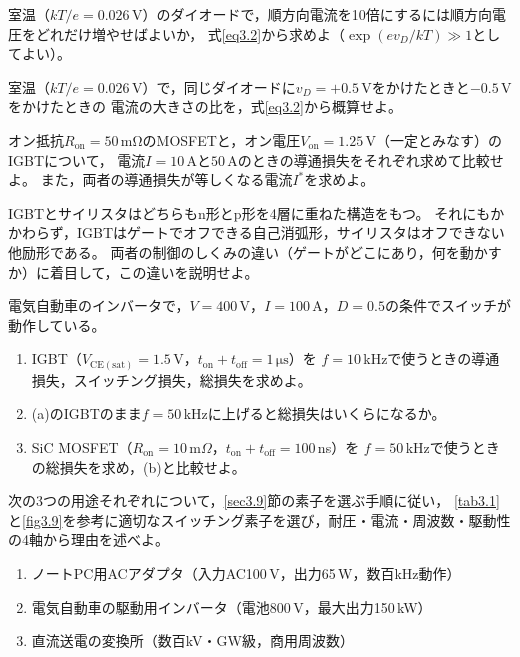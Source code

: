 \begin{章末問題}
\item \label{ex3.1}
室温（$kT/e = 0.026$\,V）のダイオードで，順方向電流を10倍にするには順方向電圧をどれだけ増やせばよいか，
式\ref{eq3.2}から求めよ（$\exp(ev_D/kT) \gg 1$としてよい）。

\item \label{ex3.2}
室温（$kT/e = 0.026$\,V）で，同じダイオードに$v_D = +0.5$\,Vをかけたときと$-0.5$\,Vをかけたときの
電流の大きさの比を，式\ref{eq3.2}から概算せよ。

\item \label{ex3.3}
オン抵抗$R_{\mathrm{on}} = 50\,\mathrm{m\Omega}$のMOSFETと，オン電圧$V_{\mathrm{on}} = 1.25$\,V（一定とみなす）のIGBTについて，
電流$I = 10$\,Aと$50$\,Aのときの導通損失をそれぞれ求めて比較せよ。
また，両者の導通損失が等しくなる電流$I^*$を求めよ。

\item \label{ex3.4}
IGBTとサイリスタはどちらもn形とp形を4層に重ねた構造をもつ。
それにもかかわらず，IGBTはゲートでオフできる自己消弧形，サイリスタはオフできない他励形である。
両者の制御のしくみの違い（ゲートがどこにあり，何を動かすか）に着目して，この違いを説明せよ。

\item \label{ex3.5}
電気自動車のインバータで，$V = 400$\,V，$I = 100$\,A，$D = 0.5$の条件でスイッチが動作している。
\begin{enumerate}
\item[(a)] IGBT（$V_{\mathrm{CE(sat)}} = 1.5$\,V，$t_{\mathrm{on}} + t_{\mathrm{off}} = 1\,\mathrm{\mu s}$）を
$f = 10$\,kHzで使うときの導通損失，スイッチング損失，総損失を求めよ。
\item[(b)] (a)のIGBTのまま$f = 50$\,kHzに上げると総損失はいくらになるか。
\item[(c)] SiC MOSFET（$R_{\mathrm{on}} = 10$\,m$\Omega$，$t_{\mathrm{on}} + t_{\mathrm{off}} = 100$\,ns）を
$f = 50$\,kHzで使うときの総損失を求め，(b)と比較せよ。
\end{enumerate}

\item \label{ex3.6}
次の3つの用途それぞれについて，\ref{sec3.9}節の素子を選ぶ手順に従い，
\ref{tab3.1}と\ref{fig3.9}を参考に適切なスイッチング素子を選び，耐圧・電流・周波数・駆動性の4軸から理由を述べよ。
\begin{enumerate}
\item[(a)] ノートPC用ACアダプタ（入力AC100\,V，出力65\,W，数百kHz動作）
\item[(b)] 電気自動車の駆動用インバータ（電池800\,V，最大出力150\,kW）
\item[(c)] 直流送電の変換所（数百kV・GW級，商用周波数）
\end{enumerate}
\end{章末問題}
